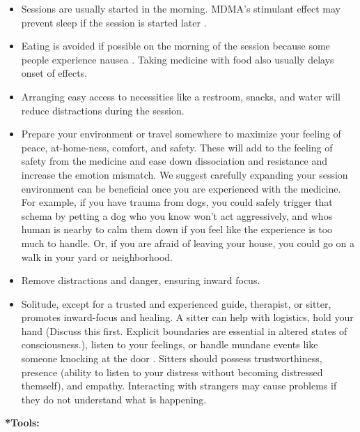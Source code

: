 \documentclass[12pt,letterpaper]{article}
\begin{document}
\begin{itemize}
    \item Sessions are usually started in the morning. MDMA's stimulant effect may prevent sleep if the session is started later \cite{berro2018acute}.
    \item Eating is avoided if possible on the morning of the session because some people experience nausea \cite{mithoeferManual}. Taking medicine with food also usually delays onset of effects.
    \item Arranging easy access to necessities like a restroom, snacks, and water will reduce distractions during the session.
    \label{contextexpansion}
    \item Prepare your environment or travel somewhere to maximize your feeling of peace, at-home-ness, comfort, and safety. These will add to the feeling of safety from the medicine and ease down dissociation and resistance and increase the emotion mismatch. We suggest carefully expanding your session environment can be beneficial once you are experienced with the medicine. For example, if you have trauma from dogs, you could safely trigger that schema by petting a dog who you know won't act aggressively, and whos human is nearby to calm them down if you feel like the experience is too much to handle. Or, if you are afraid of leaving your house, you could go on a walk in your yard or neighborhood.
    \item Remove distractions and danger, ensuring inward focus. 
    \item Solitude, except for a trusted and experienced guide, therapist, or sitter, promotes inward-focus and healing. A sitter can help with logistics, hold your hand (Discuss this first. Explicit boundaries are essential in altered states of consciousness.), listen to your feelings, or handle mundane events like someone knocking at the door \cite{mithoeferManual,thalSitter}. Sitters should possess trustworthiness, presence (ability to listen to your distress without becoming distressed themself), and empathy. Interacting with strangers may cause problems if they do not understand what is happening. 
\end{itemize}
\noindent \textbf{*Tools:}
\end{document}

